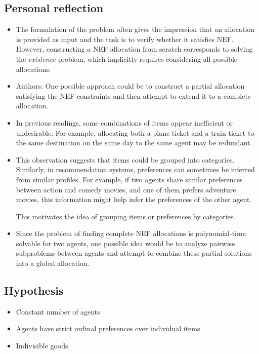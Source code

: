 \documentclass[12pt,a4paper]{article}
\begin{document}
\subsection{Personal reflection}
\begin{itemize}
    \item The formulation of the problem often gives the impression that an allocation is provided as input and the task is to verify whether it satisfies NEF.  
However, constructing a NEF allocation from scratch corresponds to solving the \textit{existence} problem, which implicitly requires considering all possible allocations.
    \item Authors: One possible approach could be to construct a partial allocation satisfying the NEF constraints and then attempt to extend it to a complete allocation.
    \item In previous readings, some combinations of items appear inefficient or undesirable.  
For example, allocating both a plane ticket and a train ticket to the same destination on the same day to the same agent may be redundant.
    \item This observation suggests that items could be grouped into categories.  
Similarly, in recommendation systems, preferences can sometimes be inferred from similar profiles.  
For example, if two agents share similar preferences between action and comedy movies, and one of them prefers adventure movies, this information might help infer the preferences of the other agent.

This motivates the idea of grouping items or preferences by categories.
    \item Since the problem of finding complete NEF allocations is polynomial-time solvable for two agents, one possible idea would be to analyze pairwise subproblems between agents and attempt to combine these partial solutions into a global allocation.
\end{itemize}

\subsection*{Hypothesis}
\begin{itemize}
    \item Constant number of agents
    \item Agents have strict ordinal preferences over individual items
    \item Indivisible goods
\end{itemize}
\end{document}
